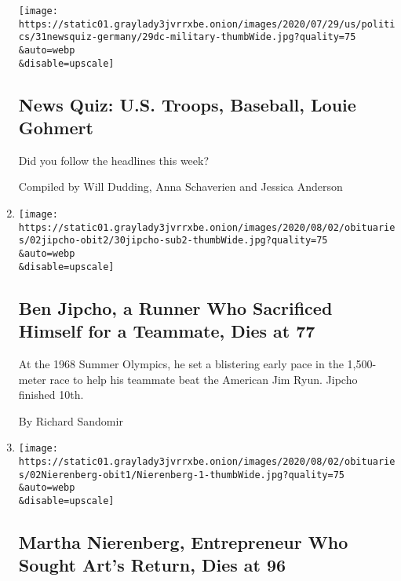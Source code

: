 \begin{enumerate}
  \texttt{[image: https://static01.graylady3jvrrxbe.onion/images/2020/07/29/us/politics/31newsquiz-germany/29dc-military-thumbWide.jpg?quality=75\\\&auto=webp\\\&disable=upscale]}

  \hypertarget{news-quiz-us-troops-baseball-louie-gohmert}{%
  \subsection{News Quiz: U.S. Troops, Baseball, Louie
  Gohmert}\label{news-quiz-us-troops-baseball-louie-gohmert}}

  Did you follow the headlines this week?

  Compiled by Will Dudding, Anna Schaverien and Jessica Anderson
\item
  \href{/2020/07/30/sports/olympics/ben-jipcho-dead.html}{}

  \texttt{[image: https://static01.graylady3jvrrxbe.onion/images/2020/08/02/obituaries/02jipcho-obit2/30jipcho-sub2-thumbWide.jpg?quality=75\\\&auto=webp\\\&disable=upscale]}

  \hypertarget{ben-jipcho-a-runner-who-sacrificed-himself-for-a-teammate-dies-at-77}{%
  \subsection{Ben Jipcho, a Runner Who Sacrificed Himself for a
  Teammate, Dies at
  77}\label{ben-jipcho-a-runner-who-sacrificed-himself-for-a-teammate-dies-at-77}}

  At the 1968 Summer Olympics, he set a blistering early pace in the
  1,500-meter race to help his teammate beat the American Jim Ryun.
  Jipcho finished 10th.

  By Richard Sandomir
\item
  \href{/2020/07/30/arts/martha-nierenberg-entrepreneur-who-sought-arts-return-dies-at-96.html}{}

  \texttt{[image: https://static01.graylady3jvrrxbe.onion/images/2020/08/02/obituaries/02Nierenberg-obit1/Nierenberg-1-thumbWide.jpg?quality=75\\\&auto=webp\\\&disable=upscale]}

  \hypertarget{martha-nierenberg-entrepreneur-who-sought-arts-return-dies-at-96}{%
  \subsection{Martha Nierenberg, Entrepreneur Who Sought Art's Return,
  Dies at
  96}\label{martha-nierenberg-entrepreneur-who-sought-arts-return-dies-at-96}}


\end{enumerate}
